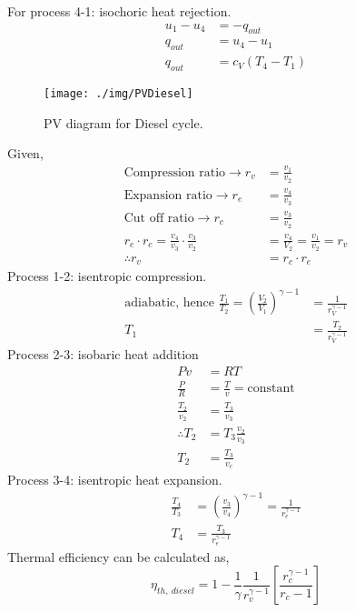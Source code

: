 For process 4-1: isochoric heat rejection.
\begin{align}
  u_1 - u_4 & = - q_{out}       \\
  q_{out}   & = u_4 - u_1       \\
  q_{out}   & = c_V (T_4 - T_1)
\end{align}
\begin{figure}
  \centering
  \texttt{[image: ./img/PVDiesel]}
  \caption{PV diagram for Diesel cycle.}
\end{figure}
Given,
\begin{align}
  \textrm{Compression ratio} \rightarrow r_v            & = \frac{v_1}{v_2}                         \\
  \textrm{Expansion ratio} \rightarrow r_e              & = \frac{v_4}{v_3}                         \\
  \textrm{Cut off ratio} \rightarrow r_c                & = \frac{v_3}{v_2}                         \\
  r_e \cdot r_c = \frac{v_4}{v_3} \cdot \frac{v_3}{v_2} & = \frac{v_4}{V_2} = \frac{v_1}{v_2} = r_v \\
  \therefore r_v                                        & = r_c \cdot r_e
\end{align}
Process 1-2: isentropic compression.
\begin{align}
  \textrm{adiabatic, hence } \frac{T_1}{T_2} = \left( \frac{V_2}{V_1} \right)^{\gamma -1} & = \frac{1}{r_V^{\gamma - 1}}                    \\
  T_1                                                                                     & = \frac{T_2}{r_V^{\gamma - 1}} \label{diesel12}
\end{align}
Process 2-3: isobaric heat addition
\begin{align}
  Pv              & = RT                               \\
  \frac{P}{R}     & = \frac{T}{v} = \textrm{constant}  \\
  \frac{T_2}{v_2} & = \frac{T_3}{v_3}                  \\
  \therefore T_2  & = T_3 \frac{v_2}{v_3}              \\
  T_2             & = \frac{T_3}{v_c} \label{diesel23}
\end{align}
Process 3-4: isentropic heat expansion.
\begin{align}
  \frac{T_4}{T_3} & = \left( \frac{v_3}{v_4} \right)^{\gamma -1} = \frac{1}{r_e^{\gamma -1}} \\
  T_4             & = \frac{T_3}{r_e^{\gamma -1}} \label{diesel34}
\end{align}
Thermal efficiency can be calculated as,
\begin{equation}
  \eta_{th, \ diesel} = 1 - \frac{1}{\gamma} \frac{1}{r_v^{\gamma -1}} \left[ \frac{r_c^{\gamma -1}}{r_c - 1} \right]
\end{equation}
